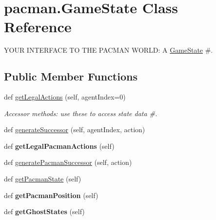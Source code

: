 \hypertarget{classpacman_1_1_game_state}{}\section{pacman.\+Game\+State Class Reference}
\label{classpacman_1_1_game_state}


Y\+O\+UR I\+N\+T\+E\+R\+F\+A\+CE TO T\+HE P\+A\+C\+M\+AN W\+O\+R\+LD\+: A \hyperlink{classpacman_1_1_game_state}{Game\+State} \#.  


\subsection*{Public Member Functions}
\begin{DoxyCompactItemize}
\item 
def \hyperlink{classpacman_1_1_game_state_a052ecff567f806c589fa08f21c8d3b15}{get\+Legal\+Actions} (self, agent\+Index=0)
\begin{DoxyCompactList}\small\item\em Accessor methods\+: use these to access state data \#. \end{DoxyCompactList}\item 
def \hyperlink{classpacman_1_1_game_state_a1c66e94fa4b64bce020b711bfefd4d81}{generate\+Successor} (self, agent\+Index, action)
\item 
\mbox{\label{classpacman_1_1_game_state_ad3301e604605140a6097fc89dc044eec}} 
def {\bfseries get\+Legal\+Pacman\+Actions} (self)
\item 
def \hyperlink{classpacman_1_1_game_state_a944c5f5ba5f3c356db326602e5734451}{generate\+Pacman\+Successor} (self, action)
\item 
def \hyperlink{classpacman_1_1_game_state_a5e17856afbfa1f0a0fbafcff73878fd8}{get\+Pacman\+State} (self)
\item 
\mbox{\label{classpacman_1_1_game_state_a33d07b517901bff5476830815c2fbc15}} 
def {\bfseries get\+Pacman\+Position} (self)
\item 
\mbox{\label{classpacman_1_1_game_state_af1cb7ad188ec2f5f2ea8a2ff2a9b9c98}} 
def {\bfseries get\+Ghost\+States} (self)
\item 
\mbox{\label{classpacman_1_1_game_state_a8751dd97bc037d03bfacef57bffbfd83}} 

\end{DoxyCompactItemize}
